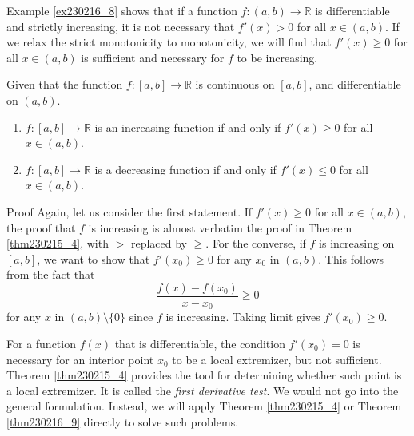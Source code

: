 Example \ref{ex230216_8} shows that if a function $f:(a, b)\to\mathbb{R}$ is differentiable and strictly increasing, it is not necessary that $f'(x)>0$ for all $x\in (a, b)$. If we relax the strict monotonicity to  monotonicity,  we will find that $f'(x)\geq 0$ for all $x\in (a, b)$ is sufficient and necessary for $f$ to be increasing.

\begin{theorem}[label=thm230216_9]{}
Given that the function $f:[a,b]\to\mathbb{R}$ is  continuous on $[a,b]$, and differentiable on $(a, b)$.
\begin{enumerate}[1.]
\item $f:[a,b]\to\mathbb{R}$ is an  increasing function if and only if   $f'(x)\geq 0$ for all $x\in (a, b)$.
\item $f:[a,b]\to\mathbb{R}$ is a decreasing function if and only if   $f'(x)\leq 0$ for all $x\in (a, b)$.
\end{enumerate}
\end{theorem}
\begin{myproof}{Proof} Again, let us consider the first statement. 
If $f'(x)\geq 0$ for all $x\in (a,b)$,  the proof that $f$ is increasing is almost verbatim the proof in Theorem \ref{thm230215_4}, with $>$ replaced by $\geq $. For the converse, if $f$ is increasing on $[a, b]$, we want to show that $f'(x_0)\geq 0$ for any $x_0$ in $(a, b)$. This follows from the fact that
\[\frac{f(x)-f(x_0)}{x-x_0}\geq 0\] for any $x$ in $(a, b)\setminus\{0\}$ since $f$ is increasing. Taking limit gives $f'(x_0)\geq 0$.
\end{myproof}

For a   function $f(x)$ that is differentiable,  the condition $f'(x_0)=0$ is   necessary  for an interior point $x_0$ to be a local extremizer, but not sufficient.
Theorem  \ref{thm230215_4} provides the tool  for determining whether such point is a local extremizer. It is called the \emph{first derivative test}. We would not go into the general formulation. Instead, we will apply Theorem  \ref{thm230215_4} or Theorem \ref{thm230216_9} directly to solve such problems.

